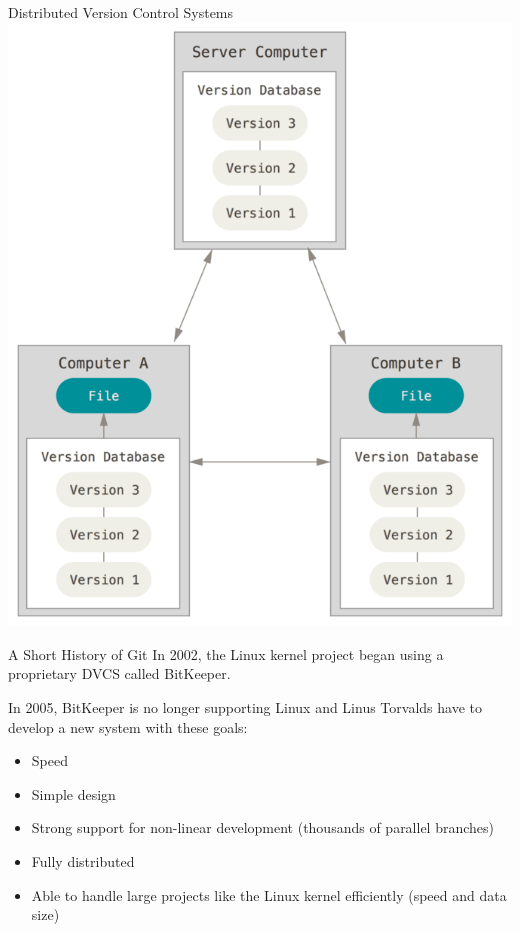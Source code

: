 \documentclass[10pt, compress]{beamer}
\begin{document}
\begin{frame}{Distributed Version Control Systems}
	\includegraphics[width=\textwidth*6/10]{images/distributed}
\end{frame}

\begin{frame}{A Short History of Git}
	In 2002, the Linux kernel project began using a proprietary DVCS called BitKeeper.
	
	In 2005, BitKeeper is no longer supporting Linux and Linus Torvalds have to develop a new system with these goals:
	\begin{itemize}
		\item Speed
		\item Simple design
		\item Strong support for non-linear development (thousands of parallel branches)
		\item Fully distributed
		\item Able to handle large projects like the Linux kernel efficiently (speed and data size)
	\end{itemize}		
\end{frame}
\end{document}
